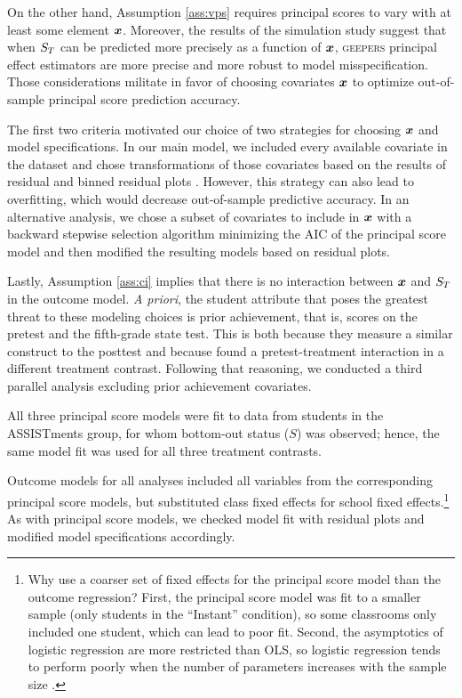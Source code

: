 \documentclass[]{article}
\begin{document}
On the other hand, Assumption \ref{ass:vps} requires principal scores to vary with at least some element $\bm{x}$. Moreover, the results of the simulation study suggest that when $S_T$ can be predicted more precisely as a function of $\bm{x}$, \textsc{geepers} principal effect estimators are more precise and more robust to model misspecification.
Those considerations militate in favor of choosing covariates $\bm{x}$ to optimize out-of-sample principal score prediction accuracy.

The first two criteria motivated our choice of two strategies for choosing $\bm{x}$ and model specifications. 
In our main model, we included every available covariate in the dataset and chose transformations of those covariates based on the results of residual and binned residual plots \citep{arm}.
%
However, this strategy can also lead to overfitting, which would decrease out-of-sample predictive accuracy.
In an alternative analysis, we chose a subset of covariates to include in $\bm{x}$ %
with a backward stepwise selection algorithm minimizing the AIC \citep{aic} of the principal score model and then modified the resulting models based on residual plots.

Lastly, Assumption \ref{ass:ci} implies that there is no interaction between $\bm{x}$ and $S_T$ in the outcome model. 
\emph{A priori}, the student attribute that poses the greatest threat to these modeling choices is prior achievement, that is, scores on the pretest and the fifth-grade state test.
This is both because they measure a similar construct to the posttest and because \cite{impactPaper} found a pretest-treatment interaction in a different treatment contrast.
Following that reasoning, we conducted a third parallel analysis excluding prior achievement covariates. %

All three principal score models were fit to data from students in the ASSISTments group, for whom bottom-out status ($S$) was observed; hence, the same model fit was used for all three treatment contrasts.

Outcome models for all analyses included all variables from the corresponding principal score models, but substituted class fixed effects for school fixed effects.\footnote{Why use a coarser set of fixed effects for the principal score model than the outcome regression? First, the principal score model was fit to a smaller sample (only students in the ``Instant'' condition), so some classrooms only included one student, which can lead to poor fit. Second, the asymptotics of logistic regression are more restricted than OLS, so logistic regression tends to perform poorly when the number of parameters increases with the sample size \citep{agresti}.}
As with principal score models, we checked model fit with residual plots and modified model specifications accordingly.
\end{document}
